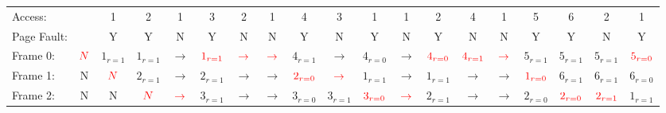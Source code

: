 \documentclass{report}
\newcommand{\ptr}[1]{\text{\textcolor{red}{$#1$}}}
\begin{document}
\begin{tiny}
	\begin{center}
		\begin{tabular}{l c c c c c c c c c c c c c c c c c c}
			Access:     &           & 1         & 2         & 1           & 3               & 2           & 1           & 4               & 3           & 1               & 1           & 2               & 4           & 1           & 5               & 6               & 2               & 1               \\
			Page Fault: &           & Y         & Y         & N           & Y               & N           & N           & Y               & N           & Y               & N           & Y               & N           & N           & Y               & Y               & N               & Y               \\
			Frame 0:    & $\ptr{N}$ & $1_{r=1}$ & $1_{r=1}$ & $\to$       & $\ptr{1_{r=1}}$ & $\ptr{\to}$ & $\ptr{\to}$ & $4_{r=1}$       & $\to$       & $4_{r=0}$       & $\to$       & $\ptr{4_{r=0}}$ & $\ptr{4_{r=1}}$ & $\ptr{\to}$ & $5_{r=1}$       & $5_{r=1}$       & $5_{r=1}$       & $\ptr{5_{r=0}}$ \\
			Frame 1:    & N         & $\ptr{N}$ & $2_{r=1}$ & $\to$       & $2_{r=1}$       & $\to$       & $\to$       & $\ptr{2_{r=0}}$ & $\ptr{\to}$ & $1_{r=1}$       & $\to$       & $1_{r=1}$       & $\to$       & $\to$       & $\ptr{1_{r=0}}$ & $6_{r=1}$       & $6_{r=1}$       & $6_{r=0}$       \\
			Frame 2:    & N         & N         & $\ptr{N}$ & $\ptr{\to}$ & $3_{r=1}$       & $\to$       & $\to$       & $3_{r=0}$       & $3_{r=1}$   & $\ptr{3_{r=0}}$ & $\ptr{\to}$ & $2_{r=1}$       & $\to$       & $\to$       & $2_{r=0}$       & $\ptr{2_{r=0}}$ & $\ptr{2_{r=1}}$ & $1_{r=1}$       \\
		\end{tabular}
	\end{center}
\end{tiny}
\end{document}
